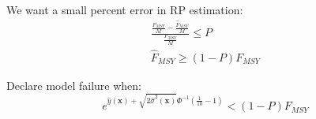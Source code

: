 \documentclass[a0paper,portrait]{baposter}
\begin{document}
\begin{poster}
{	%
	
	We want a small percent error in RP estimation:
	\begin{align*}
	\frac{\frac{F_{MSY}}{M}-\frac{\hat{F}_{MSY}}{M}}{\frac{F_{MSY}}{M}}\le P\\
	\hat{F}_{MSY}\ge(1-P)F_{MSY}
	\end{align*}
	
	Declare model failure when:
	\begin{equation*}
	e^{\hat y(\textbf{x}) + \sqrt{2\hat \sigma^2(\textbf{x})}\Phi^{-1}\left(\frac{1}{10}-1\right)}<(1-P)F_{MSY} 
	\end{equation*}


}

%
\headerbox{6. Results}{name=results, column=0, below=rp, span=2}{
	
}
\end{poster}
\end{document}
